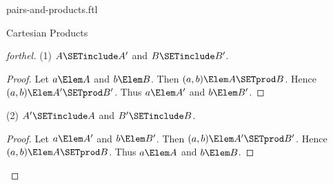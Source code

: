 \documentclass{stex}
\begin{document}
\begin{smodule}{pairs-and-products.ftl}
\begin{sfragment}{Cartesian Products}
\begin{proof}[forthel]
    (1) $A \SETinclude A'$ and $B \SETinclude B'$.
    \begin{proof}
      Let $a \Elem A$ and $b \Elem B$.
      Then $(a,b) \Elem A \SETprod B$.
      Hence $(a,b) \Elem A' \SETprod B'$.
      Thus $a \Elem A'$ and $b \Elem B'$.
    \end{proof}

    (2) $A' \SETinclude A$ and $B' \SETinclude B$.
    \begin{proof}
      Let $a \Elem A'$ and $b \Elem B'$.
      Then $(a,b) \Elem A' \SETprod B'$.
      Hence $(a,b) \Elem A \SETprod B$.
      Thus $a \Elem A$ and $b \Elem B$.
    \end{proof}
  \end{proof}
\end{sfragment}
\end{smodule}
\end{document}
